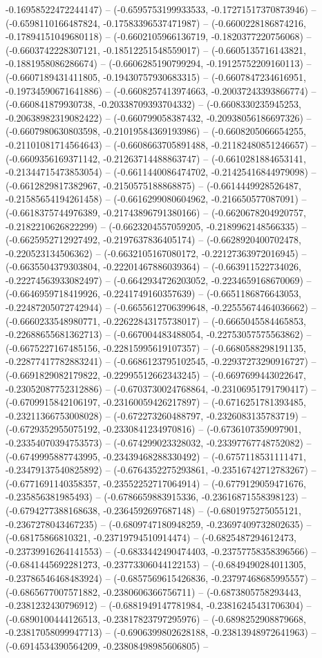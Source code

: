 -0.16958522472244147) -- (-0.6595753199933533, -0.17271517370873946) -- (-0.6598110166487824, -0.17583396537471987) -- (-0.6600228186874216, -0.17894151049680118) -- (-0.6602105966136719, -0.1820377220756068) -- (-0.6603742228307121, -0.18512251548559017) -- (-0.6605135716143821, -0.1881958086286674) -- (-0.6606285190799294, -0.19125752209160113) -- (-0.6607189431411805, -0.19430757930683315) -- (-0.6607847234616951, -0.19734590671641886) -- (-0.6608257413974663, -0.20037243393866774) -- (-0.660841879930738, -0.20338709393704332) -- (-0.6608330235945253, -0.20638982319082422) -- (-0.660799058387432, -0.20938056186697326) -- (-0.6607980630803598, -0.21019584369193986) -- (-0.6608205066654255, -0.21101081714564643) -- (-0.6608663705891488, -0.21182480851246657) -- (-0.6609356169371142, -0.21263714488863747) -- (-0.6610281884653141, -0.21344715473853054) -- (-0.6611440086474702, -0.21425416844979098) -- (-0.6612829817382967, -0.2150575188868875) -- (-0.6614449928526487, -0.21585654194261458) -- (-0.6616299080604962, -0.216650577087091) -- (-0.6618375744976389, -0.21743896791380166) -- (-0.6620678204920757, -0.2182210626822299) -- (-0.6623204557059205, -0.2189962148566335) -- (-0.6625952712927492, -0.2197637836405174) -- (-0.6628920400702478, -0.220523134506362) -- (-0.6632105167080172, -0.22127363972016945) -- (-0.6635504379303804, -0.22201467886039364) -- (-0.663911522734026, -0.22274563933082497) -- (-0.6642934726203052, -0.2234659168670069) -- (-0.6646959718419926, -0.2241749160357639) -- (-0.6651186876643053, -0.22487205072742944) -- (-0.6655612706399648, -0.22555674464036662) -- (-0.6660233548980771, -0.22622843175738017) -- (-0.6665045584465853, -0.22688655681362713) -- (-0.667004483488054, -0.22753057575563862) -- (-0.6675227167485156, -0.22815995619107357) -- (-0.6680588298191135, -0.22877417782883241) -- (-0.6686123795102545, -0.22937273290916727) -- (-0.6691829082179822, -0.22995512662343245) -- (-0.6697699443022647, -0.23052087752312886) -- (-0.6703730024768864, -0.23106951791790417) -- (-0.6709915842106197, -0.23160059426217897) -- (-0.6716251781393485, -0.23211366753008028) -- (-0.672273260488797, -0.2326083135783719) -- (-0.6729352955075192, -0.2330841234970816) -- (-0.6736107359097901, -0.23354070394753573) -- (-0.674299023328032, -0.23397767748752082) -- (-0.6749995887743995, -0.23439468288330492) -- (-0.6757118531111471, -0.23479137540825892) -- (-0.6764352275293861, -0.23516742712783267) -- (-0.6771691140358357, -0.23552252717064914) -- (-0.6779129059471676, -0.235856381985493) -- (-0.6786659883915336, -0.23616871558398123) -- (-0.6794277388168638, -0.2364592697687148) -- (-0.6801975275055121, -0.2367278043467235) -- (-0.6809747180948259, -0.23697409732802635) -- (-0.68175866810321, -0.23719794510914474) -- (-0.6825487294612473, -0.23739916264141553) -- (-0.6833442490474403, -0.23757758358396566) -- (-0.6841445692281273, -0.23773306044122153) -- (-0.6849490284011305, -0.23786546468483924) -- (-0.6857569615426836, -0.23797468685995557) -- (-0.6865677007571882, -0.2380606366756711) -- (-0.6873805758293443, -0.2381232430796912) -- (-0.6881949147781984, -0.23816245431706304) -- (-0.6890100444126513, -0.23817823797295976) -- (-0.6898252908879668, -0.23817058099947713) -- (-0.6906399802628188, -0.23813948972641963) -- (-0.6914534390564209, -0.23808498985606805) -- 